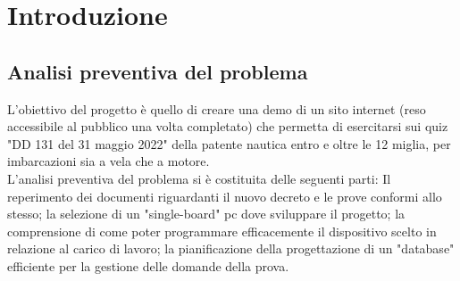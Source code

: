 \chapter{Introduzione}\label{cap:Introduzione}

\section{Analisi preventiva del problema}\label{sez:Analisi preventiva}
\raggedright
L'obiettivo del progetto è quello di creare una demo di un sito internet (reso accessibile al pubblico una volta completato) che permetta di esercitarsi sui quiz "DD 131 del 31 maggio 2022" della patente nautica entro e oltre le 12 miglia, per imbarcazioni sia a vela che a motore.\\
L'analisi preventiva del problema si è costituita delle seguenti parti: Il reperimento dei documenti riguardanti il nuovo decreto e le prove conformi allo stesso; la selezione di un "single-board" pc dove sviluppare il progetto; la comprensione di come poter programmare efficacemente il dispositivo scelto in relazione al carico di lavoro; la pianificazione della progettazione di un "database" efficiente per la gestione delle domande della prova.\\

